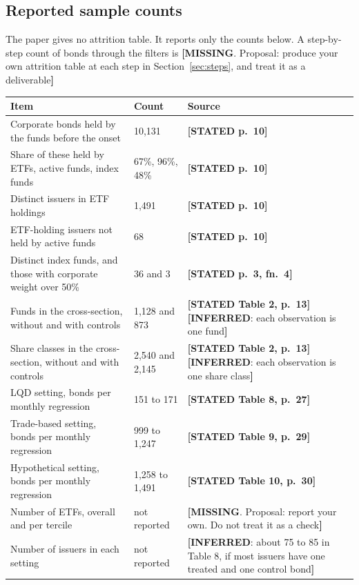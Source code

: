 \documentclass[10pt,a4paper]{article}
\newcommand{\ST}[1]{\textcolor{cst}{\textbf{[STATED #1]}}}
\newcommand{\IN}[1]{\textcolor{cin}{\textbf{[INFERRED}: #1\textbf{]}}}
\newcommand{\MI}[1]{\textcolor{cmi}{\textbf{[MISSING}. Proposal: #1\textbf{]}}}
\begin{document}
\subsection{Reported sample counts}
The paper gives no attrition table. It reports only the counts below. A step-by-step count of bonds through the filters is \MI{produce your own attrition table at each step in Section~\ref{sec:steps}, and treat it as a deliverable}
\begin{longtable}{@{}P{9cm}P{3cm}P{4.8cm}@{}}
\toprule
Item & Count & Source\\
\midrule\endhead
Corporate bonds held by the funds before the onset & 10,131 & \ST{p.~10}\\
Share of these held by ETFs, active funds, index funds & 67\%, 96\%, 48\% & \ST{p.~10}\\
Distinct issuers in ETF holdings & 1,491 & \ST{p.~10}\\
ETF-holding issuers not held by active funds & 68 & \ST{p.~10}\\
Distinct index funds, and those with corporate weight over 50\% & 36 and 3 & \ST{p.~3, fn.~4}\\
Funds in the cross-section, without and with controls & 1,128 and 873 & \ST{Table 2, p.~13} \IN{each observation is one fund}\\
Share classes in the cross-section, without and with controls & 2,540 and 2,145 & \ST{Table 2, p.~13} \IN{each observation is one share class}\\
LQD setting, bonds per monthly regression & 151 to 171 & \ST{Table 8, p.~27}\\
Trade-based setting, bonds per monthly regression & 999 to 1,247 & \ST{Table 9, p.~29}\\
Hypothetical setting, bonds per monthly regression & 1,258 to 1,491 & \ST{Table 10, p.~30}\\
Number of ETFs, overall and per tercile & not reported & \MI{report your own. Do not treat it as a check}\\
Number of issuers in each setting & not reported & \IN{about 75 to 85 in Table 8, if most issuers have one treated and one control bond}\\
\bottomrule
\end{longtable}
\end{document}
